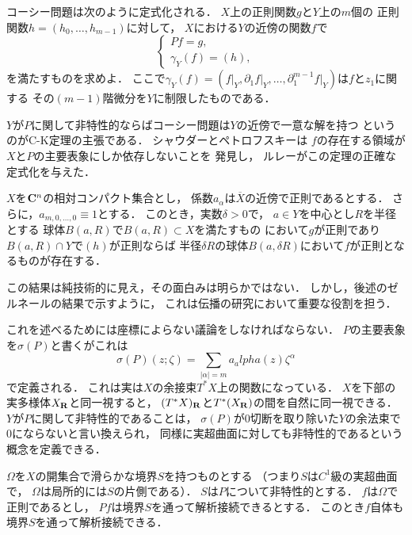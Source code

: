 コーシー問題は次のように定式化される．
\(X\)上の正則関数\(g\)と\(Y\)上の\(m\)個の
正則関数\(h=(h_0,\dots,h_{m-1})\)に対して，
\(X\)における\(Y\)の近傍の関数\(f\)で
\begin{equation}
    \begin{cases}
        Pf=g,\\
        \gamma_Y(f)=(h),
    \end{cases}
\end{equation}
を満たすものを求めよ．
ここで\(\gamma_Y(f)
=(f\rvert_Y,\partial_1f\rvert_Y,\dots
,\partial_1^{m-1}f\rvert_Y)\)は\(f\)と\(z_1\)に関する
その\((m-1)\)階微分を\(Y\)に制限したものである．

$Y$が$P$に関して非特性的ならばコーシー問題は$Y$の近傍で一意な解を持つ
というのがC-K定理の主張である．
シャウダーとペトロフスキーは
\(f\)の存在する領域が$X$と\(P\)の主要表象にしか依存しないことを
発見し，
ルレーがこの定理の正確な定式化を与えた．
\begin{THM}[C-K定理のルレーによる定式化]
    \(X\)を\(\mathbf{C}^n\)の相対コンパクト集合とし，
    係数\(a_\alpha\)は\(\overline{X}\)の近傍で正則であるとする．
    さらに，\(a_{m,0,\dots,0}\equiv1\)とする．
    このとき，実数\(\delta>0\)で，
    \(a\in Y\)を中心とし\(R\)を半径とする
    球体\(B(a,R)\)で\(B(a,R)\subset X\)を満たすもの
    において\(g\)が正則であり\(B(a,R)\cap Y\)で\((h)\)が正則ならば
    半径\(\delta R\)の球体\(B(a,\delta R)\)において\(f\)が正則となるものが存在する．
\end{THM}
この結果は純技術的に見え，その面白みは明らかではない．
しかし，後述のゼルネールの結果で示すように，
これは伝播の研究において重要な役割を担う．

これを述べるためには座標によらない議論をしなければならない．
$P$の主要表象を\(\sigma(P)\)と書くがこれは
\[
    \sigma(P)(z;\zeta)
    =\sum_{\lvert \alpha\rvert=m}a_alpha(z)\zeta^\alpha
\]
で定義される．
これは実は$X$の余接束$T^\ast X$上の関数になっている．
$X$を下部の実多様体$X_{\mathbf{R}}$と同一視すると，
$(T^\ast X)_{\mathbf{R}}$と$T^\ast(X_{\mathbf{R}})$の間を自然に同一視できる．
$Y$が$P$に関して非特性的であることは，
$\sigma(P)$が0切断を取り除いた$Y$の余法束で0にならないと言い換えられ，
同様に実超曲面に対しても非特性的であるという概念を定義できる．

\begin{PRP}
    \(\Omega\)を\(X\)の開集合で滑らかな境界\(S\)を持つものとする
    （つまり\(S\)は\(C^1\)級の実超曲面で，
    \(\Omega\)は局所的には\(S\)の片側である）．
    \(S\)は\(P\)について非特性的とする．
    \(f\)は\(\Omega\)で正則であるとし，
    \(Pf\)は境界\(S\)を通って解析接続できるとする．
    このとき\(f\)自体も境界\(S\)を通って解析接続できる．
\end{PRP}

